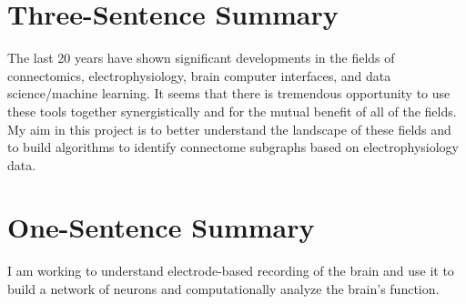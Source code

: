\documentclass[11pt]{article}
\newcommand{\sectionwithindent}[1]{%
    \section*{#1}%
    \hspace{\parindent} %
}
\begin{document}
\sectionwithindent{Three-Sentence Summary}
The last 20 years have shown significant developments in the fields of connectomics, electrophysiology, brain computer interfaces, and data science/machine learning. It seems that there is tremendous opportunity to use these tools together synergistically and for the mutual benefit of all of the fields. My aim in this project is to better understand the landscape of these fields and to build algorithms to identify connectome subgraphs based on electrophysiology data.

\sectionwithindent{One-Sentence Summary}
I am working to understand electrode-based recording of the brain and use it to build a network of neurons and computationally analyze the brain's function.

\newpage
\printbibliography
\end{document}
